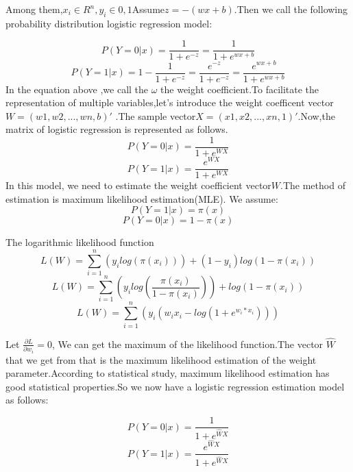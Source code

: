 \documentclass{mcmthesis}
\begin{document}
Among them,$x_i \in R^n,y_i \in {0, 1}$Assume$ z = -(wx + b)$.Then we call the following probability distribution logistic
regression model:

\begin{equation}
P(Y=0|x)=\frac1{1+e^{-z}}=\frac1{1+e^{wx+b}}
\end{equation}
\begin{equation}
P(Y=1|x)=1-\frac1{1+e^{-z}}=\frac{e^{-z}}{1+e^{-z}}=\frac{e^{wx+b}}{1+e^{wx+b}}
\end{equation}
In the equation above ,we call the $\omega$ the weight coefficient.To facilitate the representation
of multiple variables,let’s introduce the weight coefficent vector $W = (w1, w2, ..., wn, b)'$ .The sample vector$ X = (x1, x2, ..., xn, 1)'$.Now,the matrix of logistic regression is represented as follows.
\begin{equation}
P(Y=0|x)=\frac1{1+e^{WX}}
\end{equation}
\begin{equation}
P(Y=1|x)=\frac{e^{WX}}{1+e^{WX}}
\end{equation}
In this model, we need to estimate the weight coefficient vector$ W$.The method of estimation
is maximum likelihood estimation(MLE).
We assume:
\begin{equation}
P(Y=1|x)=\pi(x)
\end{equation}
\begin{equation}
P(Y=0|x)=1-\pi(x)
\end{equation}

The logarithmic likelihood function
\begin{equation}
L(W)=\sum^n_{i=1}(y_ilog(\pi(x_i)))+(1-y_i)log(1-\pi(x_i))
\end{equation}
\begin{equation}
L(W)=\sum^n_{i=1}(y_ilog(\frac{\pi(x_i)}{1-\pi(x_i)}))+log(1-\pi(x_i))
\end{equation}
\begin{equation}
L(W)=\sum^n_{i=1}(y_i(w_ix_i-log(1+e^{w_i*x_i})))
\end{equation}

Let $\frac{\partial L}{\partial w_i}=0$, We can get the maximum of the likelihood function.The vector $\hat W$ that we get
from that is the maximum likelihood estimation of the weight parameter.According to statistical study, maximum likelihood estimation has good statistical properties.So we now have a logistic
regression estimation model as follows:

\begin{equation}
P(Y=0|x)=\frac1{1+e^{\hat WX}}
\end{equation}
\begin{equation}
P(Y=1|x)=\frac{e^{\hat WX}}{1+e^{\hat WX}}
\end{equation}
\end{document}
